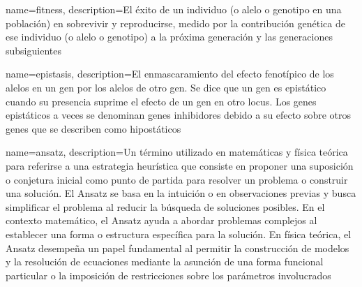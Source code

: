 {
	name=fitness,
	description={El éxito de un individuo (o alelo o genotipo en una población) en sobrevivir y reproducirse, medido por la contribución genética de ese individuo (o alelo o genotipo) a la próxima generación y las generaciones subsiguientes}
}

{
	name=epistasis,
	description={El enmascaramiento del efecto fenotípico de los alelos en un gen por los alelos de otro gen. Se dice que un gen es epistático cuando su presencia suprime el efecto de un gen en otro locus. Los genes epistáticos a veces se denominan genes inhibidores debido a su efecto sobre otros genes que se describen como hipostáticos}
}

{
	name=ansatz,
	description={Un término utilizado en matemáticas y física teórica para referirse a una estrategia heurística que consiste en proponer una suposición o conjetura inicial como punto de partida para resolver un problema o construir una solución. El Ansatz se basa en la intuición o en observaciones previas y busca simplificar el problema al reducir la búsqueda de soluciones posibles. En el contexto matemático, el Ansatz ayuda a abordar problemas complejos al establecer una forma o estructura específica para la solución. En física teórica, el Ansatz desempeña un papel fundamental al permitir la construcción de modelos y la resolución de ecuaciones mediante la asunción de una forma funcional particular o la imposición de restricciones sobre los parámetros involucrados}
}
